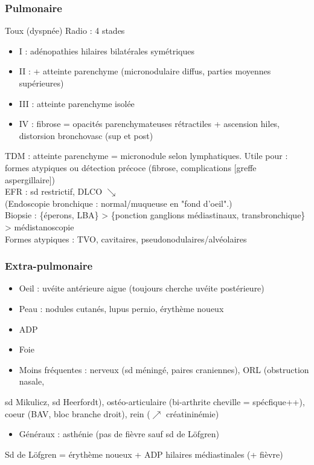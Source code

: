 \subsubsection{Pulmonaire}
\label{sec:org4ec1d7e}
Toux (dyspnée)
Radio : 4 stades
\begin{itemize}
\item I : adénopathies hilaires bilatérales symétriques
\item II : + atteinte parenchyme (micronodulaire diffus, parties moyennes supérieures)
\item III : atteinte parenchyme isolée
\item IV : fibrose = opacités parenchymateuses rétractiles + ascension hiles, distorsion bronchovasc (sup et post)
\end{itemize}
TDM : atteinte parenchyme = micronodule selon lymphatiques. Utile pour : formes atypiques ou détection précoce (fibrose, complications [greffe aspergillaire])\\
EFR : sd restrictif, DLCO $\searrow$\\
(Endoscopie bronchique : normal/muqueuse en "fond d'oeil".)\\
Biopsie : \{éperons, LBA\} > \{ponction ganglions médiastinaux, transbronchique\} > médistanoscopie\\
Formes atypiques : TVO, cavitaires, pseudonodulaires/alvéolaires

\subsubsection{Extra-pulmonaire}
\label{sec:org316c190}
\begin{itemize}
\item Oeil : uvéite antérieure aigue (toujours cherche uvéite postérieure)
\item Peau : nodules cutanés, lupus pernio, érythème noueux
\item ADP
\item Foie
\item Moins fréquentes : nerveux (sd méningé, paires craniennes), ORL (obstruction
  nasale,
\end{itemize}
sd Mikulicz, sd Heerfordt), ostéo-articulaire (bi-arthrite cheville =
spécfique++), 
coeur (BAV, bloc branche droit), rein (\(\nearrow\) créatininémie)
\begin{itemize}
\item Généraux : asthénie (pas de fièvre sauf sd de Löfgren)
\end{itemize}
Sd de Löfgren = érythème noueux + ADP hilaires médiastinales (+ fièvre)
